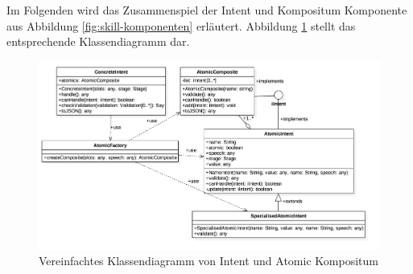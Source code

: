 Im Folgenden wird das Zusammenspiel der Intent und Kompositum Komponente aus Abbildung \ref{fig:skill-komponenten} erläutert. Abbildung \ref{fig:skill-klassen-intent} stellt das entsprechende Klassendiagramm dar.\newpage

\begin{figure}[!htb]
    \centering
    \includegraphics[width=1.0\textwidth]{bilder/4_klassenIntent.png}
    \caption{Vereinfachtes Klassendiagramm von Intent und Atomic Kompositum}
    \label{fig:skill-klassen-intent}
\end{figure}

